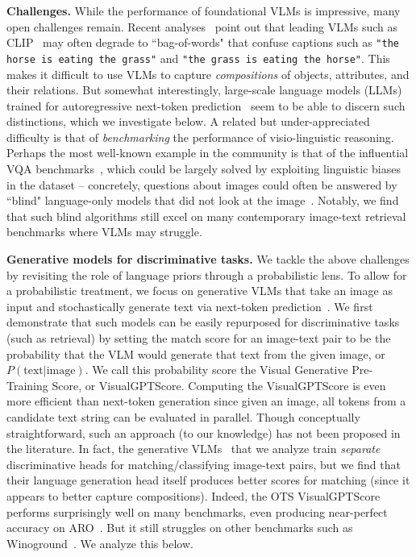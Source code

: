 \documentclass{article} \usepackage{iclr2024_conference,times}
\begin{document}
{\bf Challenges.} While the performance of foundational VLMs is impressive, many open challenges remain. Recent analyses~\citep{kamath2023text, aro} point out that leading VLMs such as CLIP~\citep{clip} may often degrade to ``bag-of-words" that confuse captions such as {\tt "the horse is eating the grass"} and {\tt "the grass is eating the horse"}. This makes it difficult to use VLMs to capture {\em compositions} of objects, attributes, and their relations. But somewhat interestingly, large-scale language models (LLMs) trained for autoregressive next-token prediction~\citep{gpt3} seem to be able to discern such distinctions, which we investigate below. A related but under-appreciated difficulty is that of {\em benchmarking} the performance of visio-linguistic reasoning. 
Perhaps the most well-known example in the community is that of the influential VQA benchmarks~\citep{vqa}, which could be largely solved by exploiting linguistic biases in the dataset -- concretely, questions about images could often be answered by ``blind" language-only models that did not look at the image~\citep{vqa2}. Notably, we find that such blind algorithms still excel on many contemporary image-text retrieval benchmarks where VLMs may struggle.

{\bf Generative models for discriminative tasks.} We tackle the above challenges by revisiting the role of language priors through a probabilistic lens. To allow for a probabilistic treatment, we focus on generative VLMs that take an image as input and stochastically generate text via next-token prediction~\citep{blip, blip2}. We first demonstrate that such models can be easily repurposed for discriminative tasks (such as retrieval) by setting the match score for an image-text pair to be the probability that the VLM would generate that text from the given image, or $P(\text{text}|\text{image})$. We call this probability score the Visual Generative Pre-Training Score, or VisualGPTScore. Computing the VisualGPTScore is even more efficient than next-token generation since given an image, all tokens from a candidate text string can be evaluated in parallel. Though conceptually straightforward, such an approach (to our knowledge) has not been proposed in the literature. In fact, the generative VLMs~\citep{blip} that we analyze train {\em separate} discriminative heads for matching/classifying image-text pairs, but we find that their language generation head itself produces better scores for matching (since it appears to better capture compositions). Indeed, the OTS VisualGPTScore performs surprisingly well on many benchmarks, even producing near-perfect accuracy on ARO~\citep{aro}. But it still struggles on other benchmarks such as Winoground~\citep{winoground}. We analyze this below. 
\end{document}
